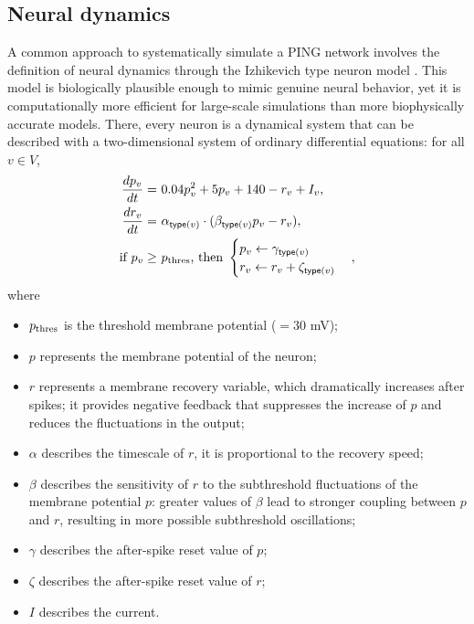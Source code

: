 \subsection{Neural dynamics}
\label{sec:neural-dynamics}

A common approach to systematically simulate a PING network involves the definition of neural dynamics through the Izhikevich type neuron model  \cite{Izhikevich2003}. This model is biologically plausible enough to mimic genuine neural behavior, yet it is computationally more efficient for large-scale simulations than more biophysically accurate models. There, every neuron is a dynamical system that can be described with a two-dimensional system of ordinary differential equations: for all $v \in V$,
\begin{align}
    \frac{dp_v}{dt} =\ & 0.04 p_v^2 + 5p_v + 140 - r_v + I_v,
    \label{eq:Izhikevich-model-dv-dt} \\
    \frac{dr_v}{dt} =\ & \alpha_{\mathsf{type}(v)} \cdot (\beta_{\mathsf{type}(v)} p_v - r_v), \label{eq:Izhikevich-model-dr-dt} \\
    \text{if } p_v \geq\ & p_{\mathrm{thres}} \text{, then } 
    \begin{cases}
        p_v \leftarrow \gamma_{\mathsf{type}(v)} \\
        r_v \leftarrow r_v + \zeta_{\mathsf{type}(v)}
    \end{cases}, 
    \label{eq:Izhikevich-model-p30}
\end{align}
where
\begin{itemize}
    \item $p_{\mathrm{thres}}$ is the threshold membrane potential ($= 30$ mV);
    
    \item $p$ represents the membrane potential of the neuron; 
    
    \item $r$ represents a membrane recovery variable, which dramatically increases after spikes; it provides negative feedback that suppresses the increase of $p$ and reduces the fluctuations in the output;
    
    \item $\alpha$ describes the timescale of $r$, it is proportional to the recovery speed;
    
    \item $\beta$ describes the sensitivity of $r$ to the subthreshold fluctuations of the membrane potential $p$: greater values of $\beta$ lead to stronger coupling between $p$ and $r$, resulting in more possible subthreshold oscillations;
    
    \item $\gamma$ describes the after-spike reset value of $p$;
    
    \item $\zeta$ describes the after-spike reset value of $r$;
    
    \item $I$ describes the current.
\end{itemize}
